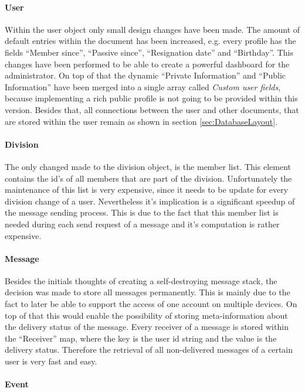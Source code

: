 \paragraph{User}
Within the user object only small design changes have been made. The amount of default entries within the document has been increased, e.g. every profile has the fields \enquote{Member since}, \enquote{Passive since}, \enquote{Resignation date} and \enquote{Birthday}. This changes have been performed to be able to create a powerful dashboard for the administrator. On top of that the dynamic \enquote{Private Information} and \enquote{Public Information} have been merged into a single array called \emph{Custom user fields}, because implementing a rich public profile is not going to be provided within this version. Besides that, all connections between the user and other documents, that are stored within the user remain as shown in section \vref{sec:DatabaseLayout}.

\paragraph{Division}
The only changed made to the division object, is the member list. This element contains the id's of all members that are part of the division. Unfortunately the maintenance of this list is very expensive, since it needs to be update for every division change of a user. Nevertheless it's implication is a significant speedup of the message sending process. This is due to the fact that this member list is needed during each send request of a message and it's computation is rather expensive.

\paragraph{Message}

Besides the initials thoughts of creating a self-destroying message stack, the decision was made to store all messages permanently. This is mainly due to the fact to later be able to support the access of one account on multiple devices. On top of that this would enable the possibility of storing meta-information about the delivery status of the message. Every receiver of a message is stored within the \enquote{Receiver} map, where the key is the user id string and the value is the delivery status. Therefore the retrieval of all non-delivered messages of a certain user is very fast and easy.

\paragraph{Event}


